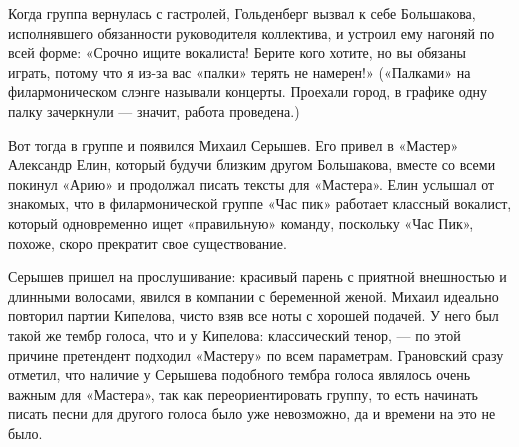 \documentclass[16pt,a5paper,oneside]{book}
\begin{document}
Когда группа вернулась с гастролей, Гольденберг вызвал к себе Большакова, исполнявшего обязанности руководителя
коллектива, и устроил ему нагоняй по всей форме: «Срочно ищите вокалиста! Берите кого хотите, но вы обязаны играть,
потому что я из-за вас «палки» терять не намерен!» («Палками» на филармоническом слэнге называли концерты. Проехали
город, в графике одну палку зачеркнули — значит, работа проведена.)

Вот тогда в группе и появился Михаил Серышев. Его привел в «Мастер» Александр Елин, который будучи близким другом
Большакова, вместе со всеми покинул «Арию» и продолжал писать тексты для «Мастера». Елин услышал от знакомых, что в
филармонической группе «Час пик» работает классный вокалист, который одновременно ищет «правильную» команду, поскольку
«Час Пик», похоже, скоро прекратит свое существование.

Серышев пришел на прослушивание: красивый парень с приятной внешностью и длинными волосами, явился в компании с
беременной женой. Михаил идеально повторил партии Кипелова, чисто взяв все ноты с хорошей подачей. У него был такой же
тембр голоса, что и у Кипелова: классический тенор, — по этой причине претендент подходил «Мастеру» по всем параметрам.
Грановский сразу отметил, что наличие у Серышева подобного тембра голоса являлось очень важным для «Мастера», так как
переориентировать группу, то есть начинать писать песни для другого голоса было уже невозможно, да и времени на это не
было.
\end{document}
